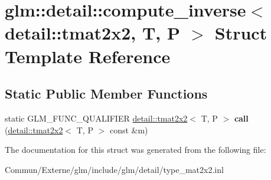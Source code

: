 \hypertarget{structglm_1_1detail_1_1compute__inverse_3_01detail_1_1tmat2x2_00_01_t_00_01_p_01_4}{}\section{glm\+:\+:detail\+:\+:compute\+\_\+inverse$<$ detail\+:\+:tmat2x2, T, P $>$ Struct Template Reference}
\label{structglm_1_1detail_1_1compute__inverse_3_01detail_1_1tmat2x2_00_01_t_00_01_p_01_4}
\subsection*{Static Public Member Functions}
\begin{DoxyCompactItemize}
\item 
static G\+L\+M\+\_\+\+F\+U\+N\+C\+\_\+\+Q\+U\+A\+L\+I\+F\+I\+ER \hyperlink{structglm_1_1detail_1_1tmat2x2}{detail\+::tmat2x2}$<$ T, P $>$ {\bfseries call} (\hyperlink{structglm_1_1detail_1_1tmat2x2}{detail\+::tmat2x2}$<$ T, P $>$ const \&m)\hypertarget{structglm_1_1detail_1_1compute__inverse_3_01detail_1_1tmat2x2_00_01_t_00_01_p_01_4_ab9c06b142ec7941cda76021e09240f30}{}\label{structglm_1_1detail_1_1compute__inverse_3_01detail_1_1tmat2x2_00_01_t_00_01_p_01_4_ab9c06b142ec7941cda76021e09240f30}

\end{DoxyCompactItemize}


The documentation for this struct was generated from the following file\+:\begin{DoxyCompactItemize}
\item 
Commun/\+Externe/glm/include/glm/detail/type\+\_\+mat2x2.\+inl\end{DoxyCompactItemize}
